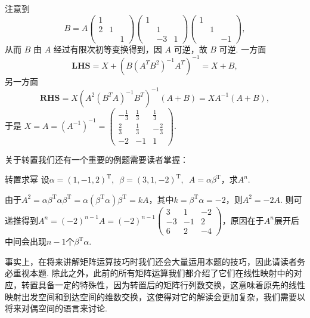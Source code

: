\begin{solution}
    注意到
    \[B=A\begin{pmatrix}
            1 &  & \\ 2 & 1 & \\ & & 1
        \end{pmatrix} \begin{pmatrix}
            1 &  & \\ & 1 & \\ & -3 & 1
        \end{pmatrix} \begin{pmatrix}
            1 &  & \\ & 1 & \\ & & -1
        \end{pmatrix},\]
    从而 $B$ 由 $A$ 经过有限次初等变换得到，因 $A$ 可逆，故 $B$ 可逆. 一方面
    \[\textbf{LHS}=X+\left(B\left(A^{T} B^{2}\right)^{-1} A^{T}\right)^{-1}=X+B,\]
    另一方面
    \[\textbf{RHS}=X\left(A^{2}\left(B^{T} A\right)^{-1} B^{T}\right)^{-1}(A+B)=X A^{-1}(A+B),\]
    于是 $X=A=(A^{-1})^{-1}=\begin{pmatrix}
            -\frac{1}{3} & \frac{1}{3} & \frac{1}{3}  \\
            \frac{2}{3}  & \frac{1}{3} & -\frac{2}{3} \\
            -2           & -1          & 1
        \end{pmatrix}$.
\end{solution}

关于转置我们还有一个重要的例题需要读者掌握：
\begin{example}{}{转置求幂}
    设$\alpha=(1,-1,2)^\mathrm{T},\enspace\beta=(3,1,-2)^\mathrm{T},\enspace A=\alpha\beta^\mathrm{T}$，求$A^n$.
\end{example}

\begin{solution}
    由于$A^2=\alpha\beta^\mathrm{T}\alpha\beta^\mathrm{T}=\alpha(\beta^\mathrm{T}\alpha)\beta^\mathrm{T}=kA$，其中$k=\beta^\mathrm{T}\alpha=-2$，则$A^2=-2A$. 则可递推得到$A^n=(-2)^{n-1}A=(-2)^{n-1}\begin{pmatrix}
            3 & 1 & -2 \\ -3 & -1 & 2 \\ 6 & 2 & -4
        \end{pmatrix}$，原因在于$A^n$展开后中间会出现$n-1$个$\beta^\mathrm{T}\alpha$.
\end{solution}

事实上，在将来讲解矩阵运算技巧时我们还会大量运用本题的技巧，因此请读者务必重视本题. 除此之外，此前的所有矩阵运算我们都介绍了它们在线性映射中的对应，转置具备一定的特殊性，因为转置后的矩阵行列数交换，这意味着原先的线性映射出发空间和到达空间的维数交换，这使得对它的解读会更加复杂，我们需要以将来对偶空间的语言来讨论.

